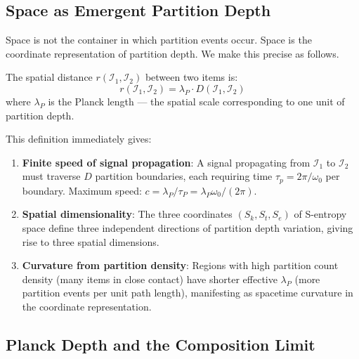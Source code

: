 \subsection{Space as Emergent Partition Depth}
\label{subsec:space}

Space is not the container in which partition events occur. Space is the
coordinate representation of partition depth. We make this precise as follows.

\begin{definition}
\label{def:space}
The spatial distance $r(\mathcal{I}_1, \mathcal{I}_2)$ between two items is:
\begin{equation}
    r(\mathcal{I}_1, \mathcal{I}_2) = \lambda_P \cdot D(\mathcal{I}_1,
    \mathcal{I}_2)
    \label{eq:space}
\end{equation}
where $\lambda_P$ is the Planck length --- the spatial scale corresponding to
one unit of partition depth.
\end{definition}

This definition immediately gives:
\begin{enumerate}
    \item \textbf{Finite speed of signal propagation}: A signal propagating
          from $\mathcal{I}_1$ to $\mathcal{I}_2$ must traverse $D$ partition
          boundaries, each requiring time $\tau_p = 2\pi/\omega_0$ per boundary.
          Maximum speed: $c = \lambda_P/\tau_P = \lambda_P \omega_0/(2\pi)$.

    \item \textbf{Spatial dimensionality}: The three coordinates $(S_k, S_t,
          S_e)$ of S-entropy space define three independent directions of
          partition depth variation, giving rise to three spatial dimensions.

    \item \textbf{Curvature from partition density}: Regions with high
          partition count density (many items in close contact) have shorter
          effective $\lambda_P$ (more partition events per unit path length),
          manifesting as spacetime curvature in the coordinate representation.
\end{enumerate}

\subsection{Planck Depth and the Composition Limit}
\label{subsec:planck_depth}

